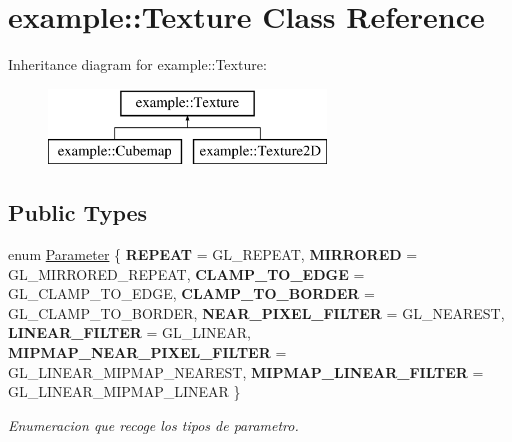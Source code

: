 \hypertarget{classexample_1_1_texture}{}\section{example\+::Texture Class Reference}
\label{classexample_1_1_texture}
Inheritance diagram for example\+::Texture\+:\begin{figure}[H]
\begin{center}
\leavevmode
\includegraphics[height=2.000000cm]{classexample_1_1_texture}
\end{center}
\end{figure}
\subsection*{Public Types}
\begin{DoxyCompactItemize}
\item 
enum \mbox{\hyperlink{classexample_1_1_texture_a4f7233e69c4a5b913dbe53d729c1765f}{Parameter}} \{ \newline
{\bfseries R\+E\+P\+E\+AT} = G\+L\+\_\+\+R\+E\+P\+E\+AT, 
{\bfseries M\+I\+R\+R\+O\+R\+ED} = G\+L\+\_\+\+M\+I\+R\+R\+O\+R\+E\+D\+\_\+\+R\+E\+P\+E\+AT, 
{\bfseries C\+L\+A\+M\+P\+\_\+\+T\+O\+\_\+\+E\+D\+GE} = G\+L\+\_\+\+C\+L\+A\+M\+P\+\_\+\+T\+O\+\_\+\+E\+D\+GE, 
{\bfseries C\+L\+A\+M\+P\+\_\+\+T\+O\+\_\+\+B\+O\+R\+D\+ER} = G\+L\+\_\+\+C\+L\+A\+M\+P\+\_\+\+T\+O\+\_\+\+B\+O\+R\+D\+ER, 
\newline
{\bfseries N\+E\+A\+R\+\_\+\+P\+I\+X\+E\+L\+\_\+\+F\+I\+L\+T\+ER} = G\+L\+\_\+\+N\+E\+A\+R\+E\+ST, 
{\bfseries L\+I\+N\+E\+A\+R\+\_\+\+F\+I\+L\+T\+ER} = G\+L\+\_\+\+L\+I\+N\+E\+AR, 
{\bfseries M\+I\+P\+M\+A\+P\+\_\+\+N\+E\+A\+R\+\_\+\+P\+I\+X\+E\+L\+\_\+\+F\+I\+L\+T\+ER} = G\+L\+\_\+\+L\+I\+N\+E\+A\+R\+\_\+\+M\+I\+P\+M\+A\+P\+\_\+\+N\+E\+A\+R\+E\+ST, 
{\bfseries M\+I\+P\+M\+A\+P\+\_\+\+L\+I\+N\+E\+A\+R\+\_\+\+F\+I\+L\+T\+ER} = G\+L\+\_\+\+L\+I\+N\+E\+A\+R\+\_\+\+M\+I\+P\+M\+A\+P\+\_\+\+L\+I\+N\+E\+AR
 \}
\begin{DoxyCompactList}\small\item\em Enumeracion que recoge los tipos de parametro. \end{DoxyCompactList}\end{DoxyCompactItemize}
